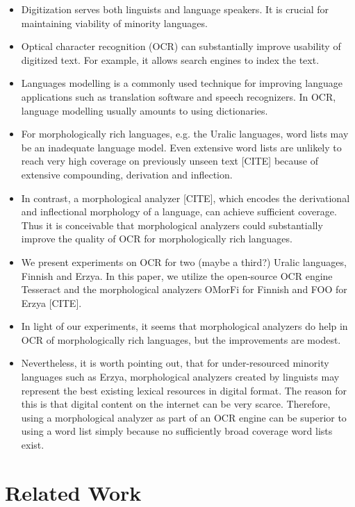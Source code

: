 \documentclass[b5paper]{article}
\begin{document}
\begin{itemize}
\item Digitization serves both linguists and language speakers. It is
  crucial for maintaining viability of minority languages.
\item Optical character recognition (OCR) can substantially improve
  usability of digitized text. For example, it allows search engines
  to index the text.
\item Languages modelling is a commonly used technique for improving
  language applications such as translation software and speech
  recognizers. In OCR, language modelling usually amounts to using
  dictionaries.
\item For morphologically rich languages, e.g. the Uralic languages,
  word lists may be an inadequate language model. Even extensive word
  lists are unlikely to reach very high coverage on previously
  unseen text [CITE] because of extensive compounding, derivation and
  inflection.
\item In contrast, a morphological analyzer [CITE], which encodes the
  derivational and inflectional morphology of a language, can achieve
  sufficient coverage. Thus it is conceivable that morphological
  analyzers could substantially improve the quality of OCR for
  morphologically rich languages.
\item We present experiments on OCR for two (maybe a third?) Uralic
  languages, Finnish and Erzya. In this paper, we utilize the
  open-source OCR engine Tesseract \cite{smith07} and the
  morphological analyzers OMorFi \cite{pirinen11} for Finnish and FOO
  for Erzya [CITE].
\item In light of our experiments, it seems that morphological
  analyzers do help in OCR of morphologically rich languages, but the
  improvements are modest.
\item Nevertheless, it is worth pointing out, that for under-resourced
  minority languages such as Erzya, morphological analyzers created by
  linguists may represent the best existing lexical resources in
  digital format. The reason for this is that digital content on the
  internet can be very scarce. Therefore, using a morphological
  analyzer as part of an OCR engine can be superior to using a word
  list simply because no sufficiently broad coverage word lists exist.
\end{itemize}

\section{Related Work}
\end{document}
